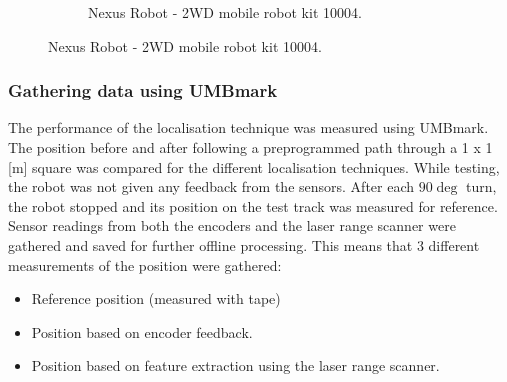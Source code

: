 \begin{figure}[ht]
\begin{subfigure}[t]{0.4\textwidth}
    \caption{Nexus Robot - 2WD mobile robot kit 10004.}
    \label{laserrange}
  \end{subfigure}
\end{figure}

\subsubsection{Gathering data using UMBmark}
The performance of the localisation technique was measured using UMBmark. 
The position before and after following a preprogrammed path through a 1 x 1 [m] square %
was compared for the different localisation techniques.
While testing, the robot was not given any feedback from the sensors.
After each $90 \deg$ turn, the robot stopped and its position on the test track was measured for reference.  
Sensor readings from both the encoders and the laser range scanner were gathered and saved for further offline processing. 
This means that 3 different measurements of the position were gathered: 
\begin{itemize}
	\item Reference position (measured with tape)
	\item Position based on encoder feedback. 
	\item Position based on feature extraction using the laser range scanner. 
\end{itemize}

